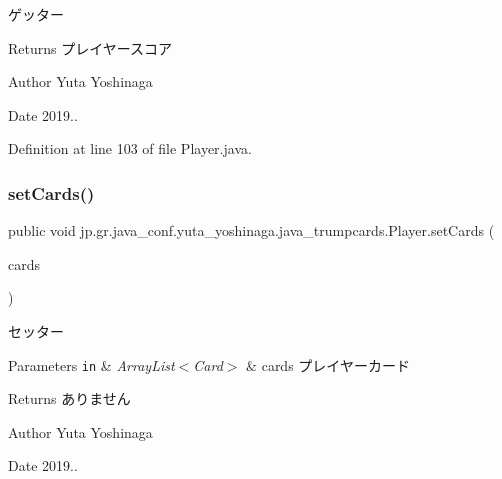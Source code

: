 ゲッター 

\begin{DoxyReturn}{Returns}
プレイヤースコア 
\end{DoxyReturn}
\begin{DoxyAuthor}{Author}
Yuta Yoshinaga 
\end{DoxyAuthor}
\begin{DoxyDate}{Date}
2019.. 
\end{DoxyDate}


Definition at line 103 of file Player.\+java.

\mbox{\label{classjp_1_1gr_1_1java__conf_1_1yuta__yoshinaga_1_1java__trumpcards_1_1_player_af3a6a421101b6e8ba60e9578a1b9ec74}} 
\subsubsection{\texorpdfstring{set\+Cards()}{setCards()}}
{\footnotesize\ttfamily public void jp.\+gr.\+java\+\_\+conf.\+yuta\+\_\+yoshinaga.\+java\+\_\+trumpcards.\+Player.\+set\+Cards (\begin{DoxyParamCaption}\item[{Array\+List$<$ \hyperlink{classjp_1_1gr_1_1java__conf_1_1yuta__yoshinaga_1_1java__trumpcards_1_1_card}{Card} $>$}]{cards }\end{DoxyParamCaption})}



セッター 


\begin{DoxyParams}[1]{Parameters}
\mbox{\tt in}  & {\em Array\+List$<$\+Card$>$} & cards プレイヤーカード \\
\hline
\end{DoxyParams}
\begin{DoxyReturn}{Returns}
ありません 
\end{DoxyReturn}
\begin{DoxyAuthor}{Author}
Yuta Yoshinaga 
\end{DoxyAuthor}
\begin{DoxyDate}{Date}
2019.. 
\end{DoxyDate}


